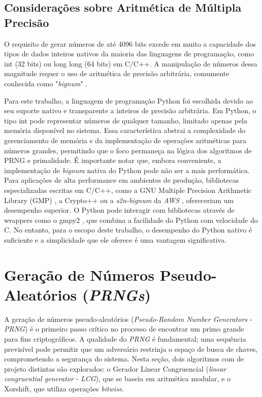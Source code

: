 \documentclass[a4paper, 11pt]{article}
\begin{document}
\subsection{Considerações sobre Aritmética de Múltipla Precisão}

O requisito de gerar números de até 4096 bits  excede em muito a capacidade dos tipos de dados inteiros nativos da maioria das linguagens de programação, como int (32 bits) ou long long (64 bits) em C/C++. A manipulação de números dessa magnitude requer o uso de aritmética de precisão arbitrária, comumente conhecida como "\textit{bignum}" \parencite{oshiro2020how_python_bignum}. 

Para este trabalho, a linguagem de programação Python foi escolhida devido ao seu suporte nativo e transparente a inteiros de precisão arbitrária. Em Python, o tipo int pode representar números de qualquer tamanho, limitado apenas pela memória disponível no sistema. Essa característica abstrai a complexidade do gerenciamento de memória e da implementação de operações aritméticas para números grandes, permitindo que o foco permaneça na lógica dos algoritmos de PRNG e primalidade. É importante notar que, embora conveniente, a implementação de \textit{bignum} nativa do Python pode não ser a mais performática. Para aplicações de alta performance em ambientes de produção, bibliotecas especializadas escritas em C/C++, como a GNU Multiple Precision Arithmetic Library (GMP) \parencite{gmp} , a Crypto++  ou a \textit{s2n-bignum} da \textit{AWS} \parencite{awslabs_s2n_bignum} , ofereceriam um desempenho superior. O Python pode interagir com bibliotecas através de wrappers como o gmpy2 , que combina a facilidade do Python com velocidade do C. No entanto, para o escopo deste trabalho, o desempenho do Python nativo é suficiente e a simplicidade que ele oferece é uma vantagem significativa.

\section{Geração de Números Pseudo-Aleatórios (\textit{PRNGs})}

A geração de números pseudo-aleatórios (\textit{Pseudo-Random Number Generators} - \textit{PRNG}) é o primeiro passo crítico no processo de encontrar um primo grande para fins criptográficos. A qualidade do \textit{PRNG} é fundamental; uma sequência previsível pode permitir que um adversário restrinja o espaço de busca de chaves, comprometendo a segurança do sistema. Nesta seção, dois algoritmos com de projeto distintas são explorados: o Gerador Linear Congruencial (\textit{linear congruential generator} - \textit{LCG}), que se baseia em aritmética modular, e o Xorshift, que utiliza operações \textit{bitwise}.
\end{document}
